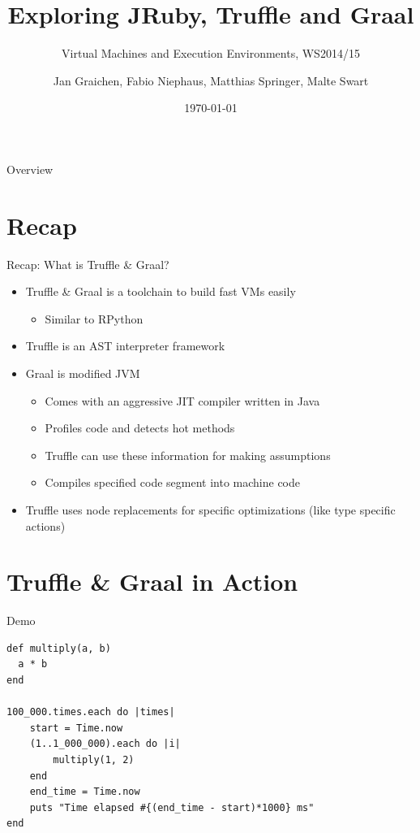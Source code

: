 \documentclass[xcolor=dvipsname,handout]{beamer} %
\title{Exploring JRuby, Truffle and Graal}
\subtitle{Virtual Machines and Execution Environments, WS2014/15}
\author{Jan Graichen, Fabio Niephaus, Matthias Springer, Malte Swart}
\date{\today}
\institute[2012]{Hasso Plattner Institute, Software Architecture Group}
\begin{document}
\begin{frame}[plain]
	\maketitle
\end{frame}
\begin{frame}{Overview}
	\tableofcontents[hideallsubsections]
\end{frame}


\section{Recap}

\begin{frame}{Recap: What is Truffle \& Graal?}
\begin{itemize}
    \item Truffle \& Graal is a toolchain to build fast VMs easily
    \begin{itemize}
      \item Similar to RPython
    \end{itemize}
    \item Truffle is an AST interpreter framework
    \item Graal is modified JVM
    \begin{itemize}
      \item Comes with an aggressive JIT compiler written in Java
      \item Profiles code and detects hot methods
      \item Truffle can use these information for making assumptions
      \item Compiles specified code segment into machine code
    \end{itemize}
    \item Truffle uses node replacements for specific optimizations (like type specific actions)
\end{itemize}
\end{frame}


\section{Truffle \& Graal in Action}

\begin{frame}[fragile]{Demo}
\begin{center}

\begin{lstlisting}
def multiply(a, b)
  a * b
end

100_000.times.each do |times|
    start = Time.now
    (1..1_000_000).each do |i|
        multiply(1, 2)
    end
    end_time = Time.now
    puts "Time elapsed #{(end_time - start)*1000} ms"
end
\end{lstlisting}
\end{center}
\end{frame}
\end{document}
